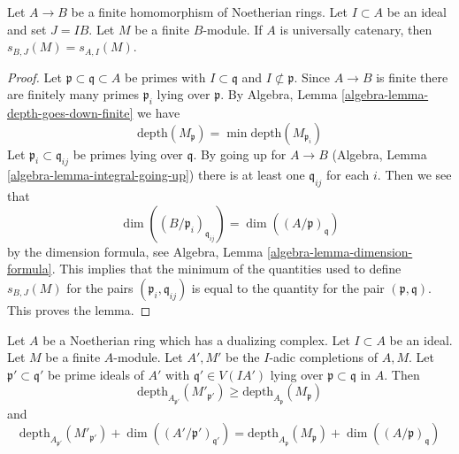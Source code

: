 \begin{lemma}
\label{lemma-cutoff}
Let $A \to B$ be a finite homomorphism of Noetherian rings.
Let $I \subset A$ be an ideal and set $J = IB$. Let $M$ be
a finite $B$-module. If $A$ is universally catenary, then
$s_{B, J}(M) = s_{A, I}(M)$.
\end{lemma}

\begin{proof}
Let $\mathfrak p \subset \mathfrak q \subset A$ be primes with
$I \subset \mathfrak q$ and $I \not \subset \mathfrak p$.
Since $A \to B$ is finite there are finitely many primes
$\mathfrak p_i$ lying over $\mathfrak p$. By
Algebra, Lemma \ref{algebra-lemma-depth-goes-down-finite}
we have
$$
\text{depth}(M_\mathfrak p) = \min \text{depth}(M_{\mathfrak p_i})
$$
Let $\mathfrak p_i \subset \mathfrak q_{ij}$ be primes lying
over $\mathfrak q$. By going up for $A \to B$
(Algebra, Lemma \ref{algebra-lemma-integral-going-up})
there is at least one $\mathfrak q_{ij}$ for each $i$.
Then we see that
$$
\dim((B/\mathfrak p_i)_{\mathfrak q_{ij}}) =
\dim((A/\mathfrak p)_\mathfrak q)
$$
by the dimension formula, see
Algebra, Lemma \ref{algebra-lemma-dimension-formula}.
This implies that the minimum of the quantities
used to define $s_{B, J}(M)$
for the pairs $(\mathfrak p_i, \mathfrak q_{ij})$
is equal to the quantity for the pair $(\mathfrak p, \mathfrak q)$.
This proves the lemma.
\end{proof}

\begin{lemma}
\label{lemma-change-completion}
Let $A$ be a Noetherian ring which has a dualizing complex.
Let $I \subset A$ be an ideal.
Let $M$ be a finite $A$-module. Let $A', M'$ be the $I$-adic
completions of $A, M$. Let $\mathfrak p' \subset \mathfrak q'$
be prime ideals of $A'$ with $\mathfrak q' \in V(IA')$
lying over $\mathfrak p \subset \mathfrak q$ in $A$. Then
$$
\text{depth}_{A_{\mathfrak p'}}(M'_{\mathfrak p'})
\geq
\text{depth}_{A_\mathfrak p}(M_\mathfrak p)
$$
and
$$
\text{depth}_{A_{\mathfrak p'}}(M'_{\mathfrak p'}) +
\dim((A'/\mathfrak p')_{\mathfrak q'}) =
\text{depth}_{A_\mathfrak p}(M_\mathfrak p) +
\dim((A/\mathfrak p)_\mathfrak q)
$$
\end{lemma}

